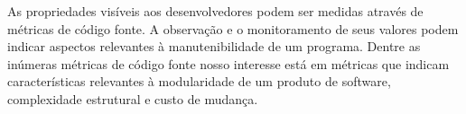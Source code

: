 
As propriedades visíveis aos desenvolvedores podem ser medidas através de
métricas de código fonte. A observação e o monitoramento de seus valores podem
indicar aspectos relevantes à manutenibilidade de um programa. Dentre as
inúmeras métricas de código fonte nosso interesse está em métricas que indicam
características relevantes à modularidade de um produto de software,
complexidade estrutural e custo de mudança.


